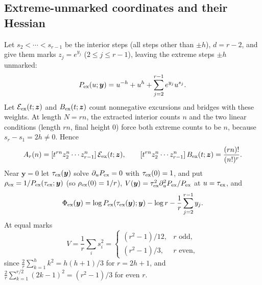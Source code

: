 \documentclass[11pt,a4paper]{article}
\numberwithin{equation}{section}
\theoremstyle{definition}\newtheorem{definition}[theorem]{Definition}
\theoremstyle{remark}\newtheorem{remark}[theorem]{Remark}
\newcommand{\E}{\mathcal E}
\begin{document}
\subsection{Extreme-unmarked coordinates and their Hessian}\label{fce:dx:sec:hessian}
Let $s_2<\cdots<s_{r-1}$ be the interior steps (all steps other than $\pm h$),
$d=r-2$, and give them marks $z_j=e^{y_j}$ ($2\le j\le r-1$), leaving the
extreme steps $\pm h$ unmarked:
\begin{equation}\label{fce:dx:eq:Pex}
 P_{\rm ex}(u;\boldsymbol y)=u^{-h}+u^h+\sum_{j=2}^{r-1}e^{y_j}u^{s_j}.
\end{equation}
Let $\E_{\rm ex}(t;\boldsymbol z)$ and $B_{\rm ex}(t;\boldsymbol z)$ count
nonnegative excursions and bridges with these weights. At length $N=rn$, the
extracted interior counts $n$ and the two linear conditions (length $rn$,
final height $0$) force both extreme counts to be $n$, because
$s_r-s_1=2h\ne0$. Hence
\begin{equation}\label{fce:dx:eq:exact}
 A_r(n)=[t^{rn}z_2^n\cdots z_{r-1}^n]\,\E_{\rm ex}(t;\boldsymbol z),\qquad
 [t^{rn}z_2^n\cdots z_{r-1}^n]\,B_{\rm ex}(t;\boldsymbol z)=\frac{(rn)!}{(n!)^r}.
\end{equation}
Near $\boldsymbol y=0$ let $\tau_{\rm ex}(\boldsymbol y)$ solve
$\partial_uP_{\rm ex}=0$ with $\tau_{\rm ex}(0)=1$, and put
$\rho_{\rm ex}=1/P_{\rm ex}(\tau_{\rm ex};\boldsymbol y)$ (so $\rho_{\rm ex}(0)=1/r$),
$V(\boldsymbol y)=\tau_{\rm ex}^2\partial_u^2P_{\rm ex}/P_{\rm ex}$ at $u=\tau_{\rm ex}$,
and
\begin{equation}\label{fce:dx:eq:phaseex}
 \Phi_{\rm ex}(\boldsymbol y)=\log P_{\rm ex}(\tau_{\rm ex}(\boldsymbol y);\boldsymbol y)
 -\log r-\frac1r\sum_{j=2}^{r-1}y_j .
\end{equation}
At equal marks
\begin{equation}\label{fce:dx:eq:variance}
 V=\frac1r\sum_is_i^2=\begin{cases}(r^2-1)/12,&r\text{ odd},\\(r^2-1)/3,&r\text{ even},\end{cases}
\end{equation}
since $\frac2r\sum_{k=1}^hk^2=h(h+1)/3$ for $r=2h+1$, and
$\frac2r\sum_{k=1}^{r/2}(2k-1)^2=(r^2-1)/3$ for even $r$.
\end{document}
